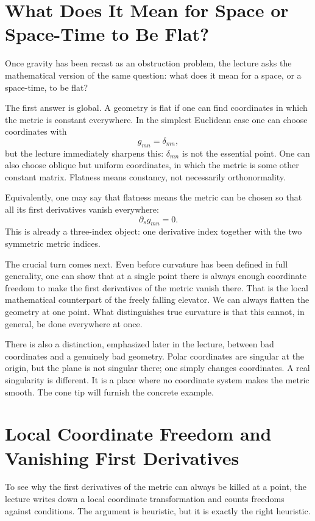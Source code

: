 \section{What Does It Mean for Space or Space-Time to Be Flat?}

Once gravity has been recast as an obstruction problem, the lecture asks the mathematical version of the same question: what does it mean for a space, or a space-time, to be flat?

The first answer is global. A geometry is flat if one can find coordinates in which the metric is constant everywhere. In the simplest Euclidean case one can choose coordinates with
\[
g_{mn}=\delta_{mn},
\]
but the lecture immediately sharpens this: \(\delta_{mn}\) is not the essential point. One can also choose oblique but uniform coordinates, in which the metric is some other constant matrix. Flatness means constancy, not necessarily orthonormality.

Equivalently, one may say that flatness means the metric can be chosen so that all its first derivatives vanish everywhere:
\begin{equation}
\partial_{s}g_{mn}=0.
\end{equation}
This is already a three-index object: one derivative index together with the two symmetric metric indices.

The crucial turn comes next. Even before curvature has been defined in full generality, one can show that at a single point there is always enough coordinate freedom to make the first derivatives of the metric vanish there. That is the local mathematical counterpart of the freely falling elevator. We can always flatten the geometry at one point. What distinguishes true curvature is that this cannot, in general, be done everywhere at once.

There is also a distinction, emphasized later in the lecture, between bad coordinates and a genuinely bad geometry. Polar coordinates are singular at the origin, but the plane is not singular there; one simply changes coordinates. A real singularity is different. It is a place where no coordinate system makes the metric smooth. The cone tip will furnish the concrete example.

\section{Local Coordinate Freedom and Vanishing First Derivatives}

To see why the first derivatives of the metric can always be killed at a point, the lecture writes down a local coordinate transformation and counts freedoms against conditions. The argument is heuristic, but it is exactly the right heuristic.

